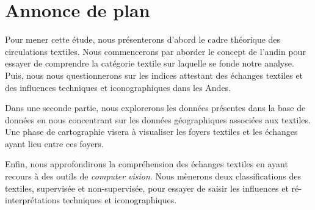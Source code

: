 \section*{Annonce de plan}
Pour mener cette étude, nous présenterons d'abord le cadre théorique des circulations textiles. Nous commencerons par aborder le concept de \og l'andin \fg \:pour essayer de comprendre la catégorie textile sur laquelle se fonde notre analyse. Puis, nous nous questionnerons sur les indices attestant des échanges textiles et des influences techniques et iconographiques dans les Andes. 

Dans une seconde partie, nous explorerons les données présentes dans la base de données en nous concentrant sur les données géographiques associées aux textiles. Une phase de cartographie visera à visualiser les foyers textiles et les échanges ayant lieu entre ces foyers.

Enfin, nous approfondirons la compréhension des échanges textiles en ayant recours à des outils de \textit{computer vision}. Nous mènerons deux classifications des textiles, supervisée et non-supervisée, pour essayer de saisir les influences et ré-interprétations techniques et iconographiques.

